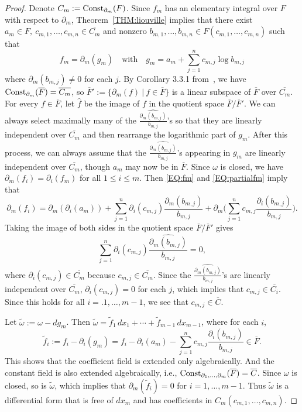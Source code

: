 \documentclass{amsart}
\theoremstyle{definition}
\numberwithin{equation}{section}
\numberwithin{thm}{section}
\newcommand{\Const}{\text{\rm Const}}
\begin{document}
\begin{proof}
	Denote $C_{m}:=\Const_{\partial_m}(F)$. Since $f_m$ has an elementary integral over $F$ with respect to $\partial_m $, Theorem~\ref{THM:liouville} implies that there exist $a_m \in F,\ c_{m,1},\ldots,c_{m,n} \in \overline{C_m}$ and nonzero $b_{m,1},\ldots,b_{m,n}\in F(c_{m,1},\ldots,c_{m,n})$ such that
	\[f_m=\partial_m(g_{m}) \quad \text{with} \quad g_m=a_{m}+\sum_{j=1}^{n}c_{m,j}\log{b_{m,j}} \]
	where $\partial_m(b_{m,j})\neq 0$ for each $j$.
By Corollary 3.3.1 from~\cite{Bronstein}, we have $\Const_{\partial_m}(\overline{F}) = \overline{C_m}$, so $\overline{F}' := \{\partial_m(f)\ | \ f\in \overline{F}\}$ is a linear subspace of $\overline{F}$ over $\overline{C_m}$. For every $f\in \overline{F}$, let $\widehat{f}$ be the image of $f$ in the quotient space $\overline{F}/\overline{F}'$. We can always select maximally many of the $\widehat{\frac{\partial_m(b_{m,j})}{b_{m,j}}}$'s so that they are linearly independent over $\overline{C_m}$ and then rearrange the logarithmic part of $g_m$. After this process, we can always assume that the $\widehat{\frac{\partial_m(b_{m,j})}{b_{m,j}}}$'s appearing in $g_m$ are linearly independent over $\overline{C_m}$, though $a_m$ may now be in $\overline{F}$. Since $\omega$ is closed, we have $\partial_m(f_i) = \partial_i(f_m)$ for all $1\leq i\leq m$.  Then \eqref{EQ:fm} and \eqref{EQ:partialfm} imply that
\[
\partial_m(f_i) =\partial_m(\partial_i(a_m))+\sum_{j=1}^{n}\partial_i(c_{m,j})\frac{\partial_m(b_{m,j})}{b_{m,j}}+\partial_m\Big(\sum_{j=1}^{n}c_{m,j}\frac{\partial_i(b_{m,j})}{b_{m,j}}\Big).
\]
Taking the image of both sides in the quotient space $\overline{F}/\overline{F}'$ gives
	\[\sum_{j=1}^{n}\partial_i(c_{m,j})\widehat{\frac{\partial_m(b_{m,j})}{b_{m,j}}}=0,\]
where $\partial_i(c_{m,j}) \in \overline{C_m}$ because $c_{m,j}\in \overline{C_m}$. Since the $\widehat{\frac{\partial_m(b_{m,j})}{b_{m,j}}}$'s are linearly independent over $\overline{C_m}$, $\partial_i(c_{m,j})=0$ for each $j$, which implies that $c_{m,j} \in \overline{C_i}$. Since this holds for all $i =. 1,\ldots,m-1$, we see that $c_{m,j}\in \overline{C} $.
	
	Let $\widetilde{\omega} := \omega-d g_m$. Then $\widetilde{\omega}= \widetilde{f}_1 \, dx_1+\cdots+\widetilde{f}_{m-1} \, dx_{m-1}$, where for each $i$,
\[
\tilde{f}_i := f_i - \partial_i(g_m) = f_i -\partial_i(a_m) - \sum_{j=1}^{n} c_{m, j} \frac{\partial_i(b_{m, j})}{b_{m, j}} \in \overline{F}.
\]
This shows that the coefficient field is extended only algebraically. And the constant field is also extended algebraically, i.e., $\Const_{\partial_1,\dots,\partial_m}(\overline{F})  = \overline{C}$. Since $\omega$ is closed, so is $\widetilde{\omega}$, which implies that $\partial_m(\tilde f_i)=0$ for $i=1, \ldots, m-1$. Thus $\widetilde{\omega}$ is a differential form that is free of $dx_m$ and has coefficients in $C_m(c_{m,1},\ldots,c_{m,n})$.
	

\end{proof}
\end{document}
